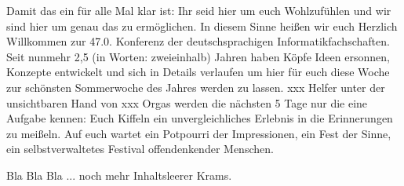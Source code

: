 
Damit das ein für alle Mal klar ist: Ihr seid hier um euch Wohlzufühlen und wir sind hier um genau das zu ermöglichen.
In diesem Sinne heißen wir euch Herzlich Willkommen zur 47.0. Konferenz der deutschsprachigen Informatikfachschaften.
Seit nunmehr 2,5 (in Worten: zweieinhalb) Jahren haben Köpfe Ideen ersonnen, Konzepte entwickelt und sich in Details verlaufen um hier für euch diese Woche zur schönsten Sommerwoche des Jahres werden zu lassen.
xxx Helfer unter der unsichtbaren Hand von xxx Orgas werden die nächsten 5 Tage nur die eine Aufgabe kennen: Euch Kiffeln ein unvergleichliches Erlebnis in die Erinnerungen zu meißeln.
Auf euch wartet ein Potpourri der Impressionen, ein Fest der Sinne, ein selbstverwaltetes Festival offendenkender Menschen.

Bla Bla Bla ... noch mehr Inhaltsleerer Krams.

